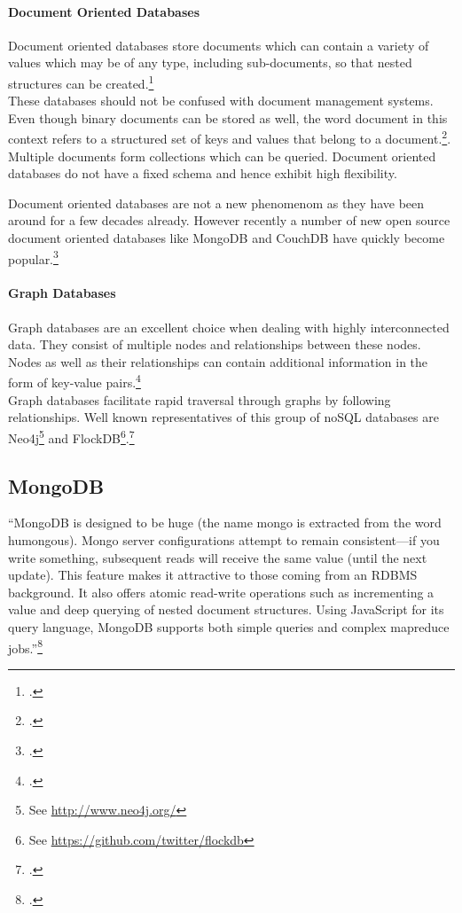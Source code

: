  
\paragraph{Document Oriented Databases}
\label{sec:nosql-document}
Document oriented databases store documents which can contain a variety of
values which may be of any type, including sub-documents, so that nested 
structures can be created.\footcite[Cf.][p. 5 et sq.]{Redmond_2012}\\
These databases should not be confused with document management systems. Even
though binary documents can be stored as well, the word document in this context
refers to a structured set of keys and values that belong to a
document.\footcite[Cf.][p. 18 et sq.]{Tiwari_2011}.\\
Multiple documents form collections which can be queried. Document oriented
databases do not have a fixed schema and hence exhibit high flexibility.

Document oriented databases are not a new phenomenom as they have been around
for a few decades already. However recently a number of new open source document 
oriented databases like MongoDB and CouchDB have quickly become popular.\footcite[Cf.][p. 18 et sq.]{Tiwari_2011}


\paragraph{Graph Databases}
\label{sec:nosql-graph}
Graph databases are an excellent choice when dealing with highly interconnected
data. They consist of multiple nodes and relationships between these nodes.
Nodes as well as their relationships can contain additional information in the
form of key-value pairs.\footcite[Cf.][6]{Redmond_2012}\\
Graph databases facilitate rapid traversal through graphs by following
relationships. Well known representatives of this group of noSQL databases are
Neo4j\footnote{See \url{http://www.neo4j.org/}} and FlockDB\footnote{See
\url{https://github.com/twitter/flockdb}}.\footcite[Cf.][19]{Tiwari_2011}


\subsection{MongoDB}
\label{sec:mongodb}


``MongoDB is designed to be huge (the name mongo is extracted from the word
humongous). Mongo server configurations attempt to remain consistent—if
you write something, subsequent reads will receive the same value (until the
next update). This feature makes it attractive to those coming from an RDBMS
background. It also offers atomic read-write operations such as incrementing
a value and deep querying of nested document structures. Using JavaScript
for its query language, MongoDB supports both simple queries and complex
mapreduce jobs.''\footcite[][6]{Redmond_2012}

